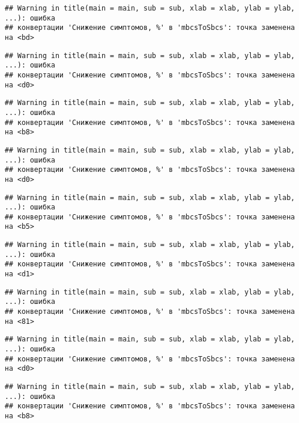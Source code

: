\documentclass[
]{article}
\begin{document}
\begin{verbatim}
## Warning in title(main = main, sub = sub, xlab = xlab, ylab = ylab, ...): ошибка
## конвертации 'Снижение симптомов, %' в 'mbcsToSbcs': точка заменена на <bd>
\end{verbatim}

\begin{verbatim}
## Warning in title(main = main, sub = sub, xlab = xlab, ylab = ylab, ...): ошибка
## конвертации 'Снижение симптомов, %' в 'mbcsToSbcs': точка заменена на <d0>
\end{verbatim}

\begin{verbatim}
## Warning in title(main = main, sub = sub, xlab = xlab, ylab = ylab, ...): ошибка
## конвертации 'Снижение симптомов, %' в 'mbcsToSbcs': точка заменена на <b8>
\end{verbatim}

\begin{verbatim}
## Warning in title(main = main, sub = sub, xlab = xlab, ylab = ylab, ...): ошибка
## конвертации 'Снижение симптомов, %' в 'mbcsToSbcs': точка заменена на <d0>
\end{verbatim}

\begin{verbatim}
## Warning in title(main = main, sub = sub, xlab = xlab, ylab = ylab, ...): ошибка
## конвертации 'Снижение симптомов, %' в 'mbcsToSbcs': точка заменена на <b5>
\end{verbatim}

\begin{verbatim}
## Warning in title(main = main, sub = sub, xlab = xlab, ylab = ylab, ...): ошибка
## конвертации 'Снижение симптомов, %' в 'mbcsToSbcs': точка заменена на <d1>
\end{verbatim}

\begin{verbatim}
## Warning in title(main = main, sub = sub, xlab = xlab, ylab = ylab, ...): ошибка
## конвертации 'Снижение симптомов, %' в 'mbcsToSbcs': точка заменена на <81>
\end{verbatim}

\begin{verbatim}
## Warning in title(main = main, sub = sub, xlab = xlab, ylab = ylab, ...): ошибка
## конвертации 'Снижение симптомов, %' в 'mbcsToSbcs': точка заменена на <d0>
\end{verbatim}

\begin{verbatim}
## Warning in title(main = main, sub = sub, xlab = xlab, ylab = ylab, ...): ошибка
## конвертации 'Снижение симптомов, %' в 'mbcsToSbcs': точка заменена на <b8>
\end{verbatim}
\end{document}
